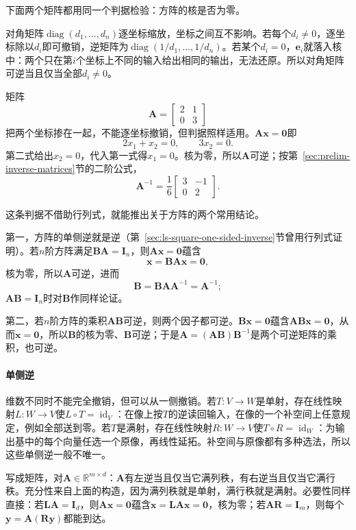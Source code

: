 下面两个矩阵都用同一个判据检验：方阵的核是否为零。
\begin{example}[用核判断可逆]
\label{ex:ls-kernel-invertibility}
对角矩阵$\operatorname{diag}(d_1,\ldots,d_n)$逐坐标缩放，坐标之间互不影响。若每个$d_i\neq0$，逐坐标除以$d_i$即可撤销，逆矩阵为$\operatorname{diag}(1/d_1,\ldots,1/d_n)$。若某个$d_i=0$，$\bm e_i$就落入核中：两个只在第$i$个坐标上不同的输入给出相同的输出，无法还原。所以对角矩阵可逆当且仅当全部$d_i\neq0$。

矩阵
\[
 \bm A=\begin{bmatrix}2&1\\0&3\end{bmatrix}
\]
把两个坐标掺在一起，不能逐坐标撤销，但判据照样适用。$\bm A\bm x=\bm0$即
\[
 2x_1+x_2=0,\qquad 3x_2=0 .
\]
第二式给出$x_2=0$，代入第一式得$x_1=0$。核为零，所以$\bm A$可逆；按第~\ref{sec:prelim-inverse-matrices}节的二阶公式，
\[
 \bm A^{-1}=\frac16\begin{bmatrix}3&-1\\0&2\end{bmatrix}.
\]
\end{example}

这条判据不借助行列式，就能推出关于方阵的两个常用结论。

第一，方阵的单侧逆就是逆（第~\ref{sec:ls-square-one-sided-inverse}节曾用行列式证明）。若$n$阶方阵满足$\bm B\bm A=\bm I_n$，则$\bm A\bm x=\bm0$蕴含
\[
 \bm x=\bm B\bm A\bm x=\bm0,
\]
核为零，所以$\bm A$可逆，进而
\[
 \bm B=\bm B\bm A\bm A^{-1}=\bm A^{-1};
\]$\bm A\bm B=\bm I_n$时对$\bm B$作同样论证。

第二，若$n$阶方阵的乘积$\bm A\bm B$可逆，则两个因子都可逆。$\bm B\bm x=\bm0$蕴含$\bm A\bm B\bm x=\bm0$，从而$\bm x=\bm0$，所以$\bm B$的核为零、$\bm B$可逆；于是$\bm A=(\bm A\bm B)\bm B^{-1}$是两个可逆矩阵的乘积，也可逆。

\paragraph{单侧逆}
维数不同时不能完全撤销，但可以从一侧撤销。若$T:V\to W$是单射，存在线性映射$L:W\to V$使$L\circ T=\operatorname{id}_V$：在像上按$T$的逆读回输入，在像的一个补空间上任意规定，例如全部送到零。若$T$是满射，存在线性映射$R:W\to V$使$T\circ R=\operatorname{id}_W$：为输出基中的每个向量任选一个原像，再线性延拓。补空间与原像都有多种选法，所以这些单侧逆一般不唯一。

写成矩阵，对$\bm A\in\mathbb R^{m\times d}$：$\bm A$有左逆当且仅当它满列秩，有右逆当且仅当它满行秩。充分性来自上面的构造，因为满列秩就是单射，满行秩就是满射。必要性同样直接：若$\bm L\bm A=\bm I_d$，则$\bm A\bm x=\bm0$蕴含$\bm x=\bm L\bm A\bm x=\bm0$，核为零；若$\bm A\bm R=\bm I_m$，则每个$\bm y=\bm A(\bm R\bm y)$都能到达。

